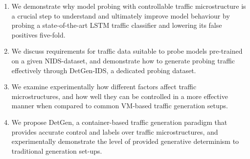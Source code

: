 \begin{enumerate}

\item We demonstrate why model probing with controllable traffic microstructure is a crucial step to understand and ultimately improve model behaviour by probing a state-of-the-art LSTM traffic classifier and lowering its false positives five-fold.


\item We discuss requirements for traffic data suitable to probe models pre-trained on a given NIDS-dataset, and demonstrate how to generate probing traffic effectively through DetGen-IDS, a dedicated probing dataset.

\item We examine experimentally how different factors affect traffic microstructures, and how well they can be controlled in a more effective manner when compared to common VM-based traffic generation setups.

\item We propose DetGen, a container-based traffic generation paradigm that provides accurate control and labels over traffic microstructures, and experimentally demonstrate the level of provided generative determinism to traditional generation set-ups.





\end{enumerate}
